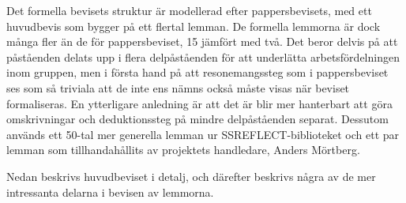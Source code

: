 Det formella bevisets struktur är modellerad efter pappersbevisets, med ett
huvudbevis som bygger på ett flertal lemman. De formella lemmorna är dock många
fler än de för pappersbeviset, 15 jämfört med två. Det beror delvis på att
påståenden delats upp i flera delpåståenden för att underlätta
arbetsfördelningen inom gruppen, men i första hand på att resonemangssteg som i
pappersbeviset ses som så triviala att de inte ens nämns också måste visas när
beviset formaliseras. En ytterligare anledning är att det är blir mer
hanterbart att göra omskrivningar och deduktionssteg på mindre delpåståenden
separat. Dessutom används ett 50-tal mer generella lemman ur
SSREFLECT-biblioteket och ett par lemman som tillhandahållits av projektets
handledare, Anders Mörtberg.

Nedan beskrivs huvudbeviset i detalj, och därefter beskrivs några av de mer
intressanta delarna i bevisen av lemmorna.

